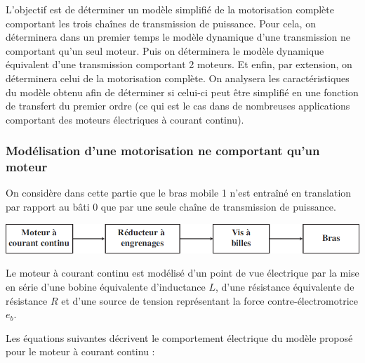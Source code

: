 \documentclass[10pt,fleqn]{article} %
\begin{document}
L’objectif est de déterminer un modèle simplifié de la motorisation complète comportant les trois chaînes de transmission de puissance. Pour cela, on déterminera  dans un premier temps  le modèle dynamique d’une transmission  ne comportant  qu’un seul moteur.  Puis on déterminera  le modèle dynamique équivalent  d’une transmission comportant 2 moteurs. Et enfin, par extension, on déterminera celui de la motorisation complète. On analysera  les caractéristiques  du modèle  obtenu afin de déterminer  si celui-ci  peut être  simplifié  en une fonction  de transfert  du premier ordre (ce  qui est  le  cas dans de nombreuses applications  comportant  des moteurs électriques à courant continu). 


\subsubsection{Modélisation d’une motorisation ne comportant qu’un moteur}

On considère dans cette partie que le bras mobile 1 n’est entraîné en translation par rapport au bâti 0 que par une seule chaîne de transmission de puissance.%

\begin{center}
\includegraphics[width=.8\linewidth]{images_01/fig_05}
\end{center}

Le moteur à courant continu est modélisé d’un point de vue électrique par la mise en série d’une bobine équivalente d’inductance $L$, d’une résistance équivalente de résistance $R$ et d’une source de tension représentant la force contre-électromotrice $e_b$.%


Les équations suivantes décrivent le comportement électrique du modèle proposé pour le moteur à courant continu :
\end{document}
